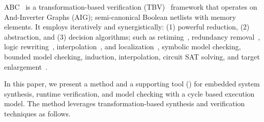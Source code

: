 ABC~\cite{brayton2010abc} is a transformation-based 
verification (TBV)~\cite{KuBa01} framework that operates on 
And-Inverter Graphs (AIG); semi-canonical Boolean netlists with
memory elements. It employs iteratively and synergistically: (1) powerful reduction, (2) abstraction, and (3) decision algorithms; such as
retiming~\cite{KuBa01}, 
redundancy removal~\cite{HmBPK05,KuMP01,BjesseC00,aziz-fmsd-00}, 
logic rewriting~\cite{BjBo04}, interpolation~\cite{McMillan03}, 
and localization~\cite{Wang03}, 
symbolic model checking, bounded model checking, induction, 
interpolation, circuit SAT solving, 
and target enlargement~\cite{MoGS00,MoMZ01,HoSH00,BaKuAb02,Hari05expert}.

In this paper, we present a method and a supporting tool (\biptool)
for embedded system synthesis, runtime verification,
and model checking with a cycle based execution model.
The method leverages transformation-based synthesis and verification techniques 
as follows. 

